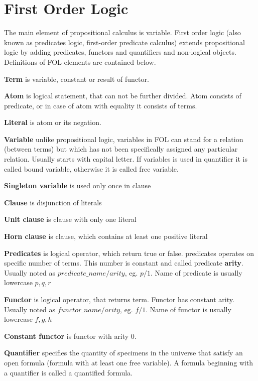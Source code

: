 \section{First Order Logic}

The main element of propositional calculus is variable. First order logic (also known as predicates logic, first-order predicate calculus) extends propositional logic by adding predicates, functors and quantifiers and non-logical objects. Definitions of FOL elements are contained below.

\textbf{Term}
is variable, constant or result of functor.

\textbf{Atom}
is logical statement, that can not be further divided. Atom consists of predicate, or in case of atom with equality it consists of terms.

\textbf{Literal}
is atom or its negation.

\textbf{Variable}
unlike propositional logic, variables in \gls{FOL} can stand for a relation (between terms) but which has not been specifically assigned any particular relation.
Usually starts with capital letter. If variables is used in quantifier it is called bound variable, otherwise it is called free variable.

\textbf{Singleton variable}
is used only once in clause

\textbf{Clause}
is disjunction of literals

\textbf{Unit clause}
is clause with only one literal

\textbf{Horn clause}
is clause, which contains at least one positive literal

\textbf{Predicates}
is logical operator, which return true or false. predicates operates on specific number of terms. This number is constant and called predicate \textbf{arity}. Usually noted as $predicate\_name/arity$, eg. $p/1$. Name of predicate is usually lowercase $p, q, r $

\textbf{Functor}
is logical operator, that returns term. Functor has constant arity. Usually noted as $functor\_name/arity$, eg. $f/1$. Name of functor  is usually lowercase $f, g, h$

\textbf{Constant functor}
is functor with arity 0.

\textbf{Quantifier}
specifies the quantity of specimens in the universe that satisfy an open formula (formula with at least one free variable). A formula beginning with a quantifier is called a quantified formula.

